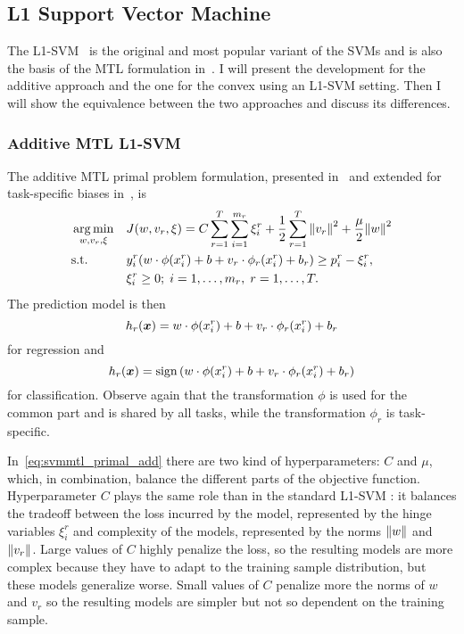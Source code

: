 \subsection{L1 Support Vector Machine}
The L1-SVM~\cite{Vapnik00} is the original and most popular variant of the SVMs and is also the basis of the MTL formulation in~\cite{EvgeniouP04}.
I will present the development for the {additive} approach and the one for the {convex} using an L1-SVM setting. Then I will show the equivalence between the two approaches and discuss its differences.

\subsubsection{{Additive} MTL L1-SVM}
The {additive} MTL primal problem formulation, presented in~\cite{EvgeniouP04} 
and extended for task-specific biases in~\cite{CaiC12}, is
\begin{equation}\label{eq:svmmtl_primal_add}
    \begin{aligned}
    & \argmin_{w, {v}_r, \xi}
    & & {J({w}, {v}_r, \xi) = C \sum_{r= 1}^T \sum_{i=1}^{m_r} {\xi_{i}^r} + \frac{1}{2} \sum_{r= 1}^T{\norm{{v}_r}^2} + \frac{\mu}{2} {\norm{{w}}}^2} \\
    & \text{s.t.}
    & & y_{i}^r ({w} \cdot \phi(x_{i}^r) + b  + {v}_r \cdot \phi_r(x_{i}^r) + b_r) \geq p_{i}^r - \xi_{i}^r ,  \\
    & & & \xi_{i}^r \geq 0; \;  i=1 , \dotsc , m_r, \;  r= 1,\dotsc, T  . \\
    \end{aligned}
\end{equation}
The prediction model is then 
\begin{equation}
    \nonumber
    h_r(\bm{x}) = {w} \cdot \phi(x_{i}^r) + b  + {v}_r \cdot \phi_r(x_{i}^r) + b_r
\end{equation}
for regression and 
\begin{equation}
    \nonumber
    h_r(\bm{x}) = \operatorname{sign}{ \left({w} \cdot \phi(x_{i}^r) + b  + {v}_r \cdot \phi_r(x_{i}^r) + b_r \right)}
\end{equation}
for classification.
Observe again that the transformation $\phi$ is used for the common part and is shared by all tasks, while the transformation $\phi_r$ is task-specific.

%
In~\eqref{eq:svmmtl_primal_add} there are two kind of hyperparameters: $C$ and $\mu$, which, in combination, balance the different parts of the objective function. 
%
Hyperparameter $C$ plays the same role than in the standard L1-SVM : it balances the tradeoff between the loss incurred by the model, represented by the hinge variables $\xi_i^r$ and complexity of the models, represented by the norms $\left\lVert{w}\right\rVert$ and $\left\lVert{v}_r\right\rVert$. Large values of $C$ highly penalize the loss, so the resulting models are more complex because they have to adapt to the training sample distribution, but these models generalize worse. Small values of $C$ penalize more the norms of $w$ and $v_r$ so the resulting models are simpler but not so dependent on the training sample.

